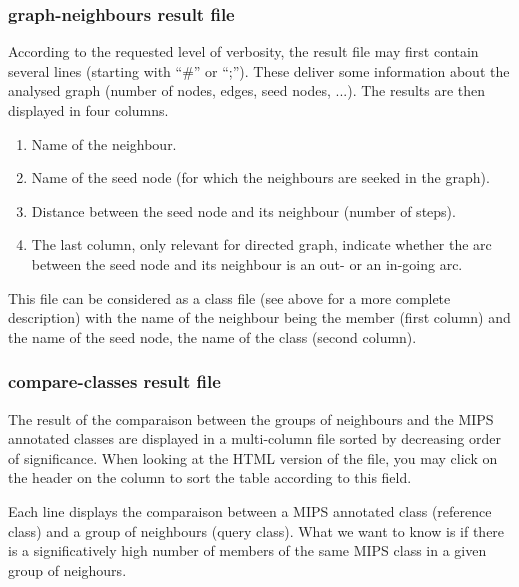 \subsubsection{graph-neighbours result file}
According to the requested level of verbosity, the result file may first contain several lines (starting with ``\#'' or ``;''). These deliver some information about the analysed graph (number of nodes, edges, seed nodes, ...).
The results are then displayed in four columns. 

\begin{enumerate}
 \item Name of the neighbour.
 \item Name of the seed node (for which the neighbours are seeked in the graph).
 \item Distance between the seed node and its neighbour (number of steps).
 \item The last column, only relevant for directed graph, indicate whether the arc between the seed node and its neighbour is an out- or an in-going arc.
\end{enumerate}

This file can be considered as a class file (see above for a more complete description) with the name of the neighbour being the member (first column) and the name of the seed node, the name of the class (second column).

\subsubsection{compare-classes result file}
The result of the comparaison between the groups of neighbours and the MIPS annotated classes are displayed in a multi-column file sorted by decreasing order of significance. When looking at the HTML version of the file, you may click on the header on the column to sort the table according to this field.

Each line displays the comparaison between a MIPS annotated class (reference class) and a group of neighbours (query class). What we want to know is if there is a significatively high number of members of the same MIPS class in a given group of neighours. 

